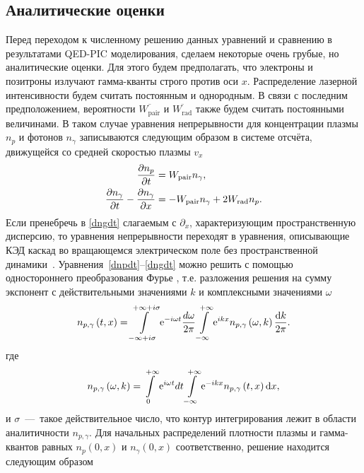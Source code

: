 \subsection{Аналитические оценки}
\label{sub:ch2/sec3/analytics}
Перед переходом к численному решению данных уравнений и сравнению в результатами QED-PIC моделирования, сделаем некоторые очень грубые, но аналитические оценки.
Для этого будем предполагать, что электроны и позитроны излучают гамма-кванты строго против оси $x$.
Распределение лазерной интенсивности будем считать постоянным и однородным.
В связи с последним предположением, вероятности $\overline{W_\mathrm{pair}}$ и $\overline{W_\mathrm{rad}}$ также будем считать постоянными величинами.
В таком случае уравнения непрерывности для концентрации плазмы $n_p$ и фотонов $n_\gamma$ записываются следующим образом в системе отсчёта, движущейся со средней скоростью плазмы $v_x$
\begin{align}
	\label{dnpdt}
    \pdv{n_{p}}{ t}  & =    W_\mathrm{pair}n_{\gamma}, \\
	\label{dngdt}   
    \pdv{ n_{\gamma}}{ t}-\pdv{ n_{\gamma}}{ x} &  =   -W_\mathrm{pair}n_{\gamma}+2W_\mathrm{rad}n_{p}.
\end{align}
Если пренебречь в \eqref{dngdt} слагаемым с $\partial_x$, характеризующим пространственную дисперсию, то уравнения непрерывности переходят в уравнения, описывающие КЭД каскад во вращающемся электрическом поле без пространственной динамики~\cite{bashmakov2014effect,grismayer2017seeded}.
Уравнения~\eqref{dnpdt}--\eqref{dngdt} можно решить с помощью одностороннего преобразования Фурье \cite{LL10}, т.е. разложения решения на сумму экспонент с действительными значениями $k$ и комплексными значениями $\omega$
\begin{equation}
    \label{t-x}
    n_{p,\gamma}\left(t,x\right) = \intop_{-\infty+i\sigma}^{+\infty+i\sigma}\mathrm{e}^{-i\omega t}\frac{d\omega}{2\pi}\intop_{-\infty}^{+\infty}\mathrm{e}^{ikx}n_{p,\gamma}\left(\omega,k\right)\frac{\dd k}{2\pi}.
\end{equation}
где
\begin{equation}
    \label{w-k}
n_{p,\gamma}\left(\omega,k\right) = \intop_{0}^{+\infty}\mathrm{e}^{i\omega t}dt\intop_{-\infty}^{+\infty}\mathrm{e}^{-ikx}n_{p,\gamma}\left(t,x\right)\dd x,
\end{equation}
и $\sigma$~---~такое действительное число, что контур интегрирования лежит в области аналитичности $n_{p,\gamma}$. 
Для начальных распределений плотности плазмы и гамма-квантов равных 
$n_{p}\left(0,x\right)$ и $n_{\gamma}\left(0,x\right)$ соответственно, решение находится следующим образом
